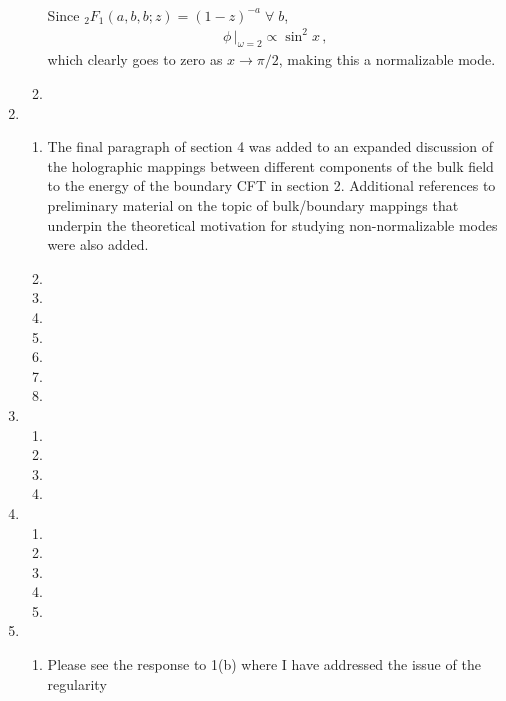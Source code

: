 \documentclass[11pt,letterpaper]{article}
\begin{document}
\begin{enumerate}
\begin{enumerate}
\begin{align}
        \end{align}
        Since ${{_2}F_1 (a, b, b; z) = (1 - z)^{-a} \; \forall \; b}$, 
        \begin{align}
            \phi\,\Big|_{\omega=2} \propto \sin^2 x \, ,
        \end{align}
        which clearly goes to zero as $x \to \pi/2$, making this a normalizable mode.
        \item 
    \end{enumerate}
    \item %
    \begin{enumerate}
        \item The final paragraph of section 4 was added to an expanded discussion of the holographic mappings
        between different components of the bulk field to the energy of the boundary CFT in section 2. Additional
        references to preliminary material on the topic of bulk/boundary mappings that underpin the 
        theoretical motivation for studying non-normalizable modes were also added.
        \item 
        \item 
        \item 
        \item 
        \item 
        \item 
        \item
    \end{enumerate}
    \item %
    \begin{enumerate}
        \item 
        \item 
        \item 
        \item 
    \end{enumerate}
    \item %
    \begin{enumerate}
        \item 
        \item 
        \item 
        \item 
        \item 
    \end{enumerate}
    \item %
    \begin{enumerate}
        \item Please see the response to 1(b) where I have addressed the issue of the regularity 

\end{enumerate}
\end{enumerate}
\end{document}
